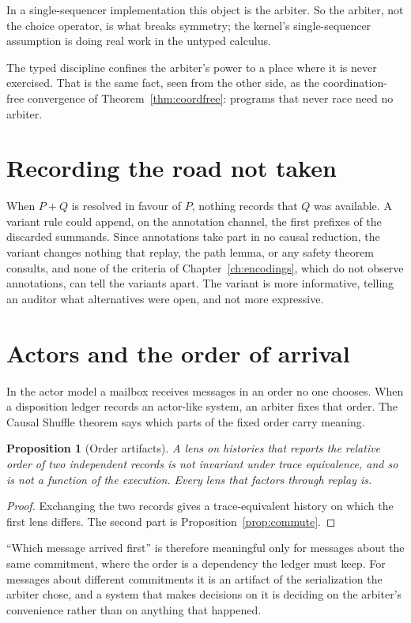 \documentclass[11pt,openany]{book}
\newtheorem{proposition}[theorem]{Proposition}
\theoremstyle{remark}
\begin{document}
In a single-sequencer implementation this object is the arbiter. So the
arbiter, not the choice operator, is what breaks symmetry; the kernel's
single-sequencer assumption is doing real work in the untyped calculus.

The typed discipline confines the arbiter's power to a place where it is
never exercised. That is the same fact, seen from the other side, as the
coordination-free convergence of Theorem~\ref{thm:coordfree}: programs
that never race need no arbiter.

\section{Recording the road not taken}

When $P+Q$ is resolved in favour of $P$, nothing records that $Q$ was
available. A variant rule could append, on the annotation channel, the
first prefixes of the discarded summands. Since annotations take part in
no causal reduction, the variant changes nothing that replay, the path
lemma, or any safety theorem consults, and none of the criteria of
Chapter~\ref{ch:encodings}, which do not observe annotations, can tell the
variants apart. The variant is more informative, telling an auditor what
alternatives were open, and not more expressive.

\section{Actors and the order of arrival}

In the actor model a mailbox receives messages in an order no one
chooses. When a disposition ledger records an actor-like system, an
arbiter fixes that order. The Causal Shuffle theorem says which parts of
the fixed order carry meaning.

\begin{proposition}[Order artifacts]\label{prop:artifact}
A lens on histories that reports the relative order of two independent
records is not invariant under trace equivalence, and so is not a
function of the execution. Every lens that factors through replay is.
\end{proposition}

\begin{proof}
Exchanging the two records gives a trace-equivalent history on which the
first lens differs. The second part is Proposition~\ref{prop:commute}.
\end{proof}

``Which message arrived first'' is therefore meaningful only for messages
about the same commitment, where the order is a dependency the ledger
must keep. For messages about different commitments it is an artifact of
the serialization the arbiter chose, and a system that makes decisions on
it is deciding on the arbiter's convenience rather than on anything that
happened.
\end{document}
